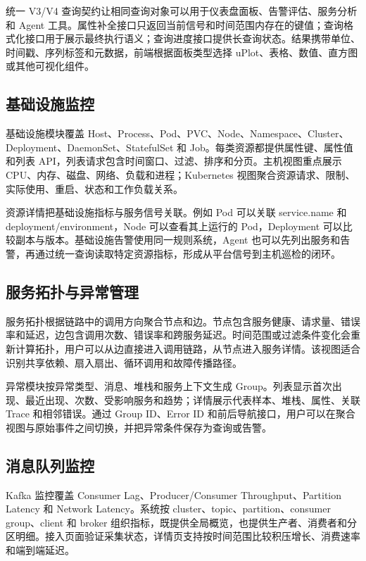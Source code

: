 \documentclass[conference,10pt]{IEEEtran}
\begin{document}
统一 V3/V4 查询契约让相同查询对象可以用于仪表盘面板、告警评估、服务分析和 Agent 工具。属性补全接口只返回当前信号和时间范围内存在的键值；查询格式化接口用于展示最终执行语义；查询进度接口提供长查询状态。结果携带单位、时间戳、序列标签和元数据，前端根据面板类型选择 uPlot、表格、数值、直方图或其他可视化组件。

\subsection{基础设施监控}

基础设施模块覆盖 Host、Process、Pod、PVC、Node、Namespace、Cluster、Deployment、DaemonSet、StatefulSet 和 Job。每类资源都提供属性键、属性值和列表 API，列表请求包含时间窗口、过滤、排序和分页。主机视图重点展示 CPU、内存、磁盘、网络、负载和进程；Kubernetes 视图聚合资源请求、限制、实际使用、重启、状态和工作负载关系。

资源详情把基础设施指标与服务信号关联。例如 Pod 可以关联 service.name 和 deployment/environment，Node 可以查看其上运行的 Pod，Deployment 可以比较副本与版本。基础设施告警使用同一规则系统，Agent 也可以先列出服务和告警，再通过统一查询读取特定资源指标，形成从平台信号到主机巡检的闭环。

\subsection{服务拓扑与异常管理}

服务拓扑根据链路中的调用方向聚合节点和边。节点包含服务健康、请求量、错误率和延迟，边包含调用次数、错误率和跨服务延迟。时间范围或过滤条件变化会重新计算拓扑，用户可以从边直接进入调用链路，从节点进入服务详情。该视图适合识别共享依赖、扇入扇出、循环调用和故障传播路径。

异常模块按异常类型、消息、堆栈和服务上下文生成 Group。列表显示首次出现、最近出现、次数、受影响服务和趋势；详情展示代表样本、堆栈、属性、关联 Trace 和相邻错误。通过 Group ID、Error ID 和前后导航接口，用户可以在聚合视图与原始事件之间切换，并把异常条件保存为查询或告警。

\subsection{消息队列监控}

Kafka 监控覆盖 Consumer Lag、Producer/Consumer Throughput、Partition Latency 和 Network Latency。系统按 cluster、topic、partition、consumer group、client 和 broker 组织指标，既提供全局概览，也提供生产者、消费者和分区明细。接入页面验证采集状态，详情页支持按时间范围比较积压增长、消费速率和端到端延迟。
\end{document}
